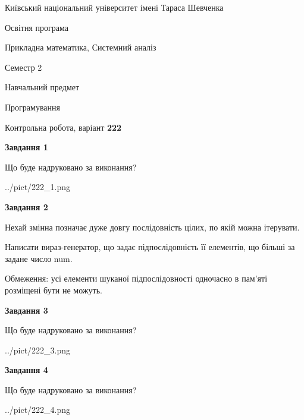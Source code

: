\documentclass[12pt, ukrainian]{article}
\begin{document}
{{\begin {small}\par
{ \center  Київський національний університет імені Тараса Шевченка \par}
{\parbox {5 cm}{Освітня програма \hfill}{\parbox {8 cm}{Прикладна математика, Системний аналіз \hfill}}\parbox {5 cm}{\hfill Семестр 2}}\par
{\parbox {5 cm} {Навчальний предмет \hfill}\parbox {7 cm}{Програмування \hfill}\parbox {6cm}{\hfill}\par}\vspace{-7pt} \end{small}}{\center Контрольна робота, варіант  \No \textbf
{ 222 }\par}}
{
\begin {large}
{\begin {center}\textbf{Завдання 1}\end {center}}\par
Що буде надруковано за виконання?\par\par
\begin{center}
	{../pict/222_1.png}
\end{center}
\newpage

{\begin {center}\textbf{Завдання 2}\end {center}}\par
Нехай змінна  позначає дуже довгу послідовність цілих, по якій можна ітерувати.

Написати вираз-генератор, що задає підпослідовність її елементів, що більші за задане число num.

Обмеження: усі елементи шуканої підпослідовності одночасно в пам'яті розміщені бути не можуть.\par
\newpage

{\begin {center}\textbf{Завдання 3}\end {center}}\par
Що буде надруковано за виконання?
\begin{center}
	{../pict/222_3.png}
\end{center}
\newpage

{\begin {center}\textbf{Завдання 4}\end {center}}\par
Що буде надруковано за виконання?\par
\begin{center}
	{../pict/222_4.png}
\end{center}
\newpage


\end{large}}
\end{document}
